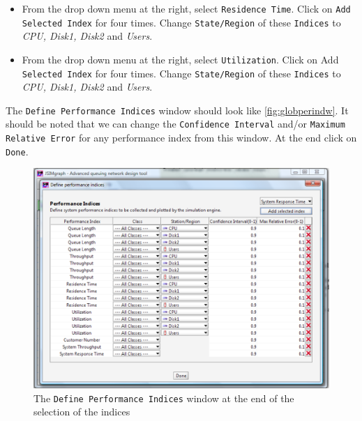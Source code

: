\begin{itemize}
\item From the drop down menu at the right, select
\texttt{Residence Time}. Click on \texttt{Add Selected Index} for
four times. Change \texttt{State/Region} of these \texttt{Indices}
to \emph{CPU, Disk1, Disk2} and \emph{Users}.

\item From the drop down menu at the right, select
\texttt{Utilization}. Click on Add \texttt{Selected Index} for
four times. Change \texttt{State/Region} of these \texttt{Indices}
to \emph{CPU, Disk1, Disk2} and \emph{Users}.
\end{itemize}
The \texttt{Define Performance Indices} window should look like
\autoref{fig:globperindw}. It should be noted that we can change
the \texttt{Confidence Interval} and/or \texttt{Maximum Relative
Error} for any performance index from this window. At the end
click on \texttt{Done}.\\
\begin{figure}[htb]
    \begin{center}
        \includegraphics[scale=.5]{img/jsimg/12.13.eps}
    \end{center}
    \caption{The \texttt{Define Performance Indices} window at the end
    of the selection of the indices}
    \label{fig:globperindw}
\end{figure}

